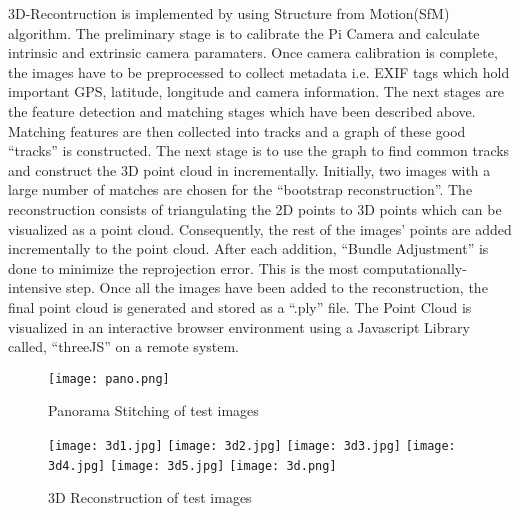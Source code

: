  3D-Recontruction is implemented by using Structure from Motion(SfM) algorithm. The preliminary stage is to calibrate the Pi Camera and calculate intrinsic and extrinsic camera paramaters. Once camera calibration is complete, the images have to be preprocessed to collect metadata i.e. EXIF tags which hold important GPS, latitude, longitude and camera information. The next stages are the feature detection and matching stages which have been described above. Matching features are then collected into tracks and a graph of these good “tracks” is constructed. The next stage is to use the graph to find common tracks and construct the 3D point cloud in incrementally. Initially, two images with a large number of matches are chosen for the “bootstrap reconstruction”. The reconstruction consists of triangulating the 2D points to 3D points which can be visualized as a point cloud. Consequently, the rest of the images' points are added incrementally to the point cloud. After each addition, “Bundle Adjustment” is done to minimize the reprojection error. This is the most computationally-intensive step. Once all the images have been added to the reconstruction, the final point cloud is generated and stored as a “.ply” file. The Point Cloud is visualized in an interactive browser environment using a Javascript Library called, “threeJS” on a remote system.   

\begin{figure}[H]
  \centering
  \texttt{[image: pano.png]}
  \caption{Panorama Stitching of test images}
  \label{pano}	
\end{figure}

\begin{figure}[H]
  \centering
  \texttt{[image: 3d1.jpg]}
  \texttt{[image: 3d2.jpg]}
  \texttt{[image: 3d3.jpg]}
  \texttt{[image: 3d4.jpg]}
  \texttt{[image: 3d5.jpg]}
  \texttt{[image: 3d.png]}
  \caption{3D Reconstruction of test images}
  \label{recon}	
\end{figure}

